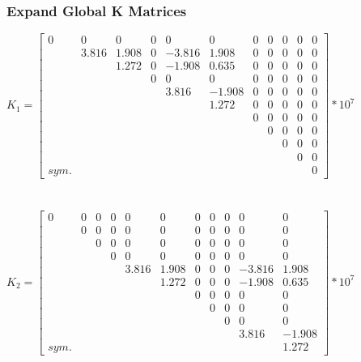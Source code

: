 \documentclass{article}
\begin{document}
\subsubsection*{Expand Global K Matrices}
$K_1=\begin{bmatrix}
    0 & 0 & 0 & 0 & 0 & 0 & 0 & 0 & 0 & 0 & 0 \\
    & 3.816 & 1.908 & 0 & -3.816 & 1.908 & 0 & 0 & 0 & 0 & 0 \\
    & & 1.272 & 0 & -1.908 & 0.635 & 0 & 0 & 0 & 0 & 0 \\
    & & & 0 & 0 & 0 & 0 & 0 & 0 & 0 & 0 \\
    & & & & 3.816 & -1.908 & 0 & 0 & 0 & 0 & 0 \\
    & & & & & 1.272 & 0 & 0 & 0 & 0 & 0 \\
    & & & & & & 0 & 0 & 0 & 0 & 0 \\
    & & & & & & & 0 & 0 & 0 & 0 \\
    & & & & & & & & 0 & 0 & 0 \\
    & & & & & & & & & 0 & 0 \\
    sym. & & & & & & & & & & 0
\end{bmatrix}*10^7$ \\\\\\
$K_2=\begin{bmatrix}
    0 & 0 & 0 & 0 & 0 & 0 & 0 & 0 & 0 & 0 & 0 \\
    & 0 & 0 & 0 & 0 & 0 & 0 & 0 & 0 & 0 & 0 \\
    & & 0 & 0 & 0 & 0 & 0 & 0 & 0 & 0 & 0 \\
    & & & 0 & 0 & 0 & 0 & 0 & 0 & 0 & 0 \\
    & & & & 3.816 & 1.908 & 0 & 0 & 0 & -3.816 & 1.908 \\
    & & & & & 1.272 & 0 & 0 & 0 & -1.908 & 0.635 \\
    & & & & & & 0 & 0 & 0 & 0 & 0 \\
    & & & & & & & 0 & 0 & 0 & 0 \\
    & & & & & & & & 0 & 0 & 0 \\
    & & & & & & & & & 3.816 & -1.908 \\
    sym. & & & & & & & & & & 1.272
\end{bmatrix}*10^7$ \\\\\\
\end{document}
